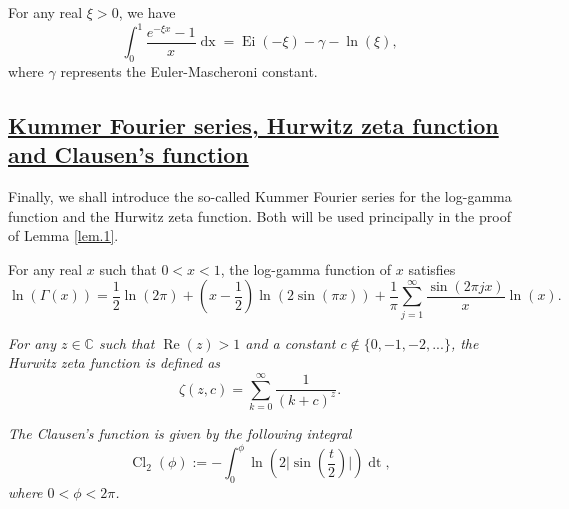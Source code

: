 \documentclass[preprint,12pt,nopreprintline]{elsarticle}
\begin{document}
For any real $\xi>0$, we have
\begin{equation}
\nonumber
\int_0^1\frac{e^{-\xi x}-1}{x}\operatorname{dx}=\operatorname{Ei}\left(-\xi\right)-\gamma-\operatorname{ln}\left(\xi\right),
\end{equation}
where $\gamma$ represents the Euler-Mascheroni constant.

\subsection{\underline{Kummer Fourier series, Hurwitz zeta function and Clausen’s function}}\label{subsec:3.3}

\vspace{0.1cm}
Finally, we shall introduce the so-called Kummer Fourier series for the log-gamma function \cite{erdelyi1953higher} and the Hurwitz zeta function. Both will be used principally in the proof of Lemma \ref{lem.1}.

For any real $x$ such that $0<x<1$, the log-gamma function of $x$ satisfies
\begin{equation}
\nonumber
\operatorname{ln}\left(\Gamma\left(x\right)\right)=\frac{1}{2}\operatorname{ln}\left(2\pi\right)+\left(x-\frac{1}{2}\right)\operatorname{ln}\left(2\operatorname{sin}\left(\pi x\right)\right)+\frac{1}{\pi}\sum_{j=1}^{\infty}\frac{\operatorname{sin}\left(2\pi jx\right)}{x}\operatorname{ln}\left(x\right).
\end{equation}

\vspace{0.1cm}
\begin{definition}\cite{apostol2013introduction}
\textit{For any $z\in\mathbb{C}$ such that $\operatorname{Re}\left(z\right)>1$ and a constant $c\notin\{0,-1,-2,...\}$, the Hurwitz zeta function is defined as}
\begin{equation}
\nonumber
\zeta\left(z,c\right)=\sum_{k=0}^{\infty}\frac{1}{\left(k+c\right)^z}.
\end{equation}
\end{definition}

\begin{definition}\cite{apostol2013introduction}
\textit{The Clausen’s function is given by the following integral}
\begin{equation}
\operatorname{Cl}_2\left(\phi\right):=-\int_0^{\phi}\operatorname{ln}\left(2\Bigg\vert\operatorname{sin}\left(\frac{t}{2}\right)\Bigg\vert\right)\operatorname{dt},
\end{equation}
\textit{where $0<\phi<2\pi$.}
\end{definition}
\end{document}
